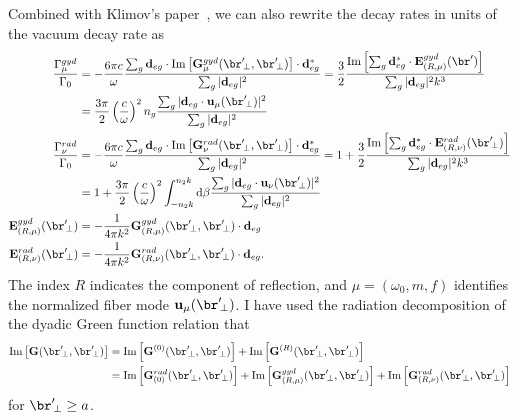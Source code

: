 \documentclass[preprint,aps,pra,onecolumn]{revtex4-1}
\begin{document}
Combined with Klimov's paper~\cite{Klimov2004}, we can also rewrite the decay rates in units of the
vacuum decay rate as
\begin{align}
\frac{\Gamma^{gyd}_\mu}{\Gamma_0} &= - \frac{6\pi c}{\omega}\frac{\sum_g\mathbf{d}_{eg}\cdot 
\mathrm{Im}\left[\mathbf{G}_\mu^{gyd}(\br'\!_\perp,\br'\!_\perp) \right]\cdot\mathbf{d}_{eg}^* 
}{\sum_g|\mathbf{d}_{eg}|^2} =  \frac{3}{2} \frac{\mathrm{Im}\left[\sum_g\mathbf{d}_{eg}^*\cdot 
\mathbf{E}_{(R,\mu)}^{gyd}(\br') \right]}{\sum_g|\mathbf{d}_{eg}|^2 k^3}\nonumber\\
&=\frac{3\pi}{2}\left(\frac{c}{\omega}\right)^2 n_g  \frac{\sum_{g}|\mathbf{d}_{eg}\cdot 
\mathbf{u}_\mu(\br'\!_\perp)|^2}{\sum_g|\mathbf{d}_{eg}|^2}\\
\frac{\Gamma^{rad}_\nu}{\Gamma_0} &= - \frac{6\pi c}{\omega}\frac{\sum_g\mathbf{d}_{eg}\cdot 
\mathrm{Im}\left[\mathbf{G}_\nu^{rad}(\br'\!_\perp,\br'\!_\perp) \right]\cdot\mathbf{d}_{eg}^* 
}{\sum_g|\mathbf{d}_{eg}|^2} =  1+ \frac{3}{2} \frac{\mathrm{Im}\left[\sum_g\mathbf{d}_{eg}^*\cdot 
\mathbf{E}_{(R,\nu)}^{rad}(\br'\!_\perp) \right]}{\sum_g|\mathbf{d}_{eg}|^2 k^3}\nonumber\\
&=1+\frac{3\pi}{2}\left(\frac{c}{\omega}\right)^2\int_{-n_2k}^{n_2k}\mathrm{d}\beta  
\frac{\sum_{g}|\mathbf{d}_{eg}\cdot 
\mathbf{u}_\nu(\br'\!_\perp)|^2}{\sum_g|\mathbf{d}_{eg}|^2}\\
\mathbf{E}_{(R,\mu)}^{gyd}(\br'\!_\perp) &= - \frac{1}{4\pi k^2}  
\mathbf{G}^{gyd}_{(R,\mu)}(\br'\!_\perp,\br'\!_\perp)\cdot 
\mathbf{d}_{eg} \\
\mathbf{E}_{(R,\nu)}^{rad}(\br'\!_\perp) &= - \frac{1}{4\pi k^2}  
\mathbf{G}^{rad}_{(R,\nu)}(\br'\!_\perp,\br'\!_\perp)\cdot 
\mathbf{d}_{eg}.
\end{align}
The index $ R $ indicates the component of reflection, and $\mu=(\omega_0,m,f)  $ identifies the 
normalized  fiber mode $ \mathbf{u}_\mu(\br'\!_\perp) $. I have used the radiation decomposition of the 
dyadic Green function relation that  
\begin{align}
\mathrm{Im} \left[ \mathbf{G}(\br'\!_\perp,\br'\!_\perp) \right] &= 
\mathrm{Im} \left[ \mathbf{G}^{(0)}(\br'\!_\perp,\br'\!_\perp)\right] +\mathrm{Im} \left[ 
\mathbf{G}^{(R)}(\br'\!_\perp,\br'\!_\perp)\right] \\
&=
\mathrm{Im} \left[ \mathbf{G}^{rad}_{(0)}(\br'\!_\perp,\br'\!_\perp)\right] +\mathrm{Im} \left[ 
\mathbf{G}^{gyd}_{(R,\mu)}(\br'\!_\perp,\br'\!_\perp) \right] 
+\mathrm{Im} \left[ \mathbf{G}^{rad}_{(R,\nu)}(\br'\!_\perp,\br'\!_\perp)\right]
\end{align}
for $ \br'\!_\perp\ge a $.
\end{document}
